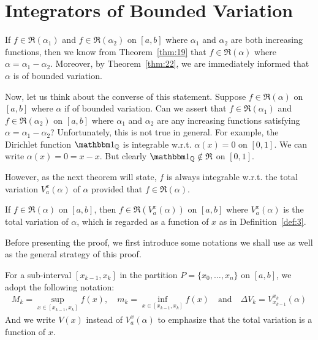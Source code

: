 \documentclass[thmcnt=section, 12pt]{my-elegantbook}
\begin{document}

\section{Integrators of Bounded Variation}
\label{sec:1}

If $f \in \mathfrak{R}(\alpha_1)$ and $f \in \mathfrak{R}(\alpha_2)$ on $[a, b]$ where $\alpha_1$ and $\alpha_2$ are both increasing functions, then we know from Theorem~\ref{thm:19} that $f \in \mathfrak{R}(\alpha)$ where $\alpha = \alpha_1 - \alpha_2$. Moreover, by Theorem~\ref{thm:22}, we are immediately informed that $\alpha$ is of bounded variation.

Now, let us think about the converse of this statement. Suppose $f \in \mathfrak{R}(\alpha)$ on $[a, b]$ where $\alpha$ if of bounded variation. Can we assert that $f \in \mathfrak{R}(\alpha_1)$ and $f \in \mathfrak{R}(\alpha_2)$ on $[a, b]$ where $\alpha_1$ and $\alpha_2$ are any increasing functions satisfying $\alpha = \alpha_1 - \alpha_2$? Unfortunately, this is not true in general. For example, the Dirichlet function $\ind_\Q$ is integrable w.r.t. $\alpha(x) = 0$ on $[0, 1]$. We can write $\alpha(x) = 0 = x - x$. But clearly $\ind_\Q \notin \mathfrak{R}$ on $[0, 1]$.

However, as the next theorem will state, $f$ is always integrable
w.r.t. the total variation $V_a^x(\alpha)$ of $\alpha$
provided that $f \in \mathfrak{R}(\alpha)$.

\begin{theorem} \label{thm:37}
    If $f \in \mathfrak{R}(\alpha)$ on $[a, b]$, then $f \in \mathfrak{R}(V_a^x(\alpha))$ on $[a, b]$ where $V_a^x(\alpha)$ is the total variation of $\alpha$, which is regarded as a function of $x$ as in Definition~\ref{def:3}.
\end{theorem}

Before presenting the proof, we first introduce some notations we shall use as well as the general strategy of this proof.

For a sub-interval $[x_{k-1}, x_k]$ in the partition $P = \{ x_0, \ldots, x_n \}$ on $[a, b]$, we adopt the following notation:
\begin{align*}
    M_k = \sup_{x \in [x_{k-1}, x_k]} f(x),
    \quad
    m_k = \inf_{x \in [x_{k-1}, x_k]} f(x)
    \quad\text{and}\quad
    \Delta V_k = V_{x_{k-1}}^{x_k}(\alpha)
\end{align*}
And we write $V(x)$ instead of $V_a^x(\alpha)$ to emphasize that the total variation is a function of $x$.
\end{document}
